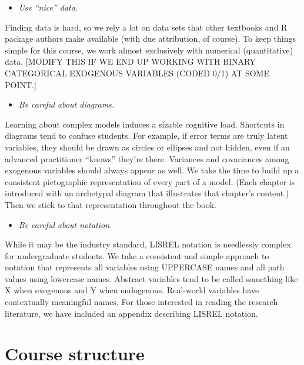 \documentclass[
]{book}
\providecommand{\tightlist}{%
  \setlength{\itemsep}{0pt}\setlength{\parskip}{0pt}}
\begin{document}
\begin{itemize}
\tightlist
\item
  \emph{Use ``nice'' data.}
\end{itemize}

Finding data is hard, so we rely a lot on data sets that other textbooks and R package authors make available (with due attribution, of course). To keep things simple for this course, we work almost exclusively with numerical (quantitative) data. {[}MODIFY THIS IF WE END UP WORKING WITH BINARY CATEGORICAL EXOGENOUS VARIABLES (CODED 0/1) AT SOME POINT.{]}

\begin{itemize}
\tightlist
\item
  \emph{Be careful about diagrams.}
\end{itemize}

Learning about complex models induces a sizable cognitive load. Shortcuts in diagrams tend to confuse students. For example, if error terms are truly latent variables, they should be drawn as circles or ellipses and not hidden, even if an advanced practitioner ``knows'' they're there. Variances and covariances among exogenous variables should always appear as well. We take the time to build up a consistent pictographic representation of every part of a model. (Each chapter is introduced with an archetypal diagram that illustrates that chapter's content.) Then we stick to that representation throughout the book.

\begin{itemize}
\tightlist
\item
  \emph{Be careful about notation.}
\end{itemize}

While it may be the industry standard, LISREL notation is needlessly complex for undergraduate students. We take a consistent and simple approach to notation that represents all variables using UPPERCASE names and all path values using lowercase names. Abstract variables tend to be called something like X when exogenous and Y when endogenous. Real-world variables have contextually meaningful names. For those interested in reading the research literature, we have included an appendix describing LISREL notation.

\hypertarget{intro-structure}{%
\section*{Course structure}\label{intro-structure}}
\end{document}
